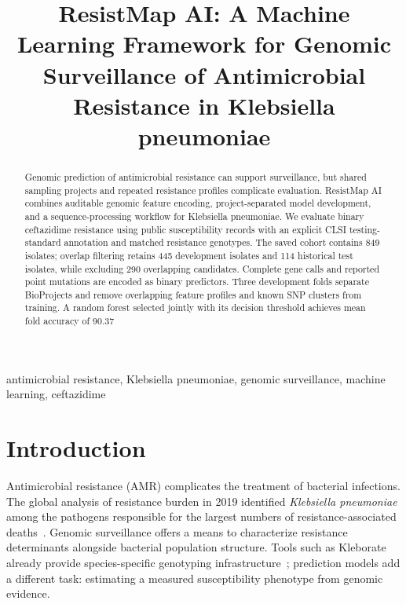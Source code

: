 \documentclass[conference]{IEEEtran}
\newcommand{\kp}{\textit{Klebsiella pneumoniae}}
\begin{document}
\title{ResistMap AI: A Machine Learning Framework for Genomic Surveillance of Antimicrobial Resistance in Klebsiella pneumoniae}
\author{
}
\maketitle
\begin{abstract}
Genomic prediction of antimicrobial resistance can support surveillance, but shared sampling projects and repeated resistance profiles complicate evaluation. ResistMap AI combines auditable genomic feature encoding, project-separated model development, and a sequence-processing workflow for Klebsiella pneumoniae. We evaluate binary ceftazidime resistance using public susceptibility records with an explicit CLSI testing-standard annotation and matched resistance genotypes. The saved cohort contains 849 isolates; overlap filtering retains 445 development isolates and 114 historical test isolates, while excluding 290 overlapping candidates. Complete gene calls and reported point mutations are encoded as binary predictors. Three development folds separate BioProjects and remove overlapping feature profiles and known SNP clusters from training. A random forest selected jointly with its decision threshold achieves mean fold accuracy of 90.37%
\end{abstract}
\begin{IEEEkeywords}
antimicrobial resistance, Klebsiella pneumoniae, genomic surveillance, machine learning, ceftazidime
\end{IEEEkeywords}

\section{Introduction}
Antimicrobial resistance (AMR) complicates the treatment of bacterial infections. The global analysis of resistance burden in 2019 identified \kp{} among the pathogens responsible for the largest numbers of resistance-associated deaths~\cite{burden}. Genomic surveillance offers a means to characterize resistance determinants alongside bacterial population structure. Tools such as Kleborate already provide species-specific genotyping infrastructure~\cite{kleborate}; prediction models add a different task: estimating a measured susceptibility phenotype from genomic evidence.
\end{document}
